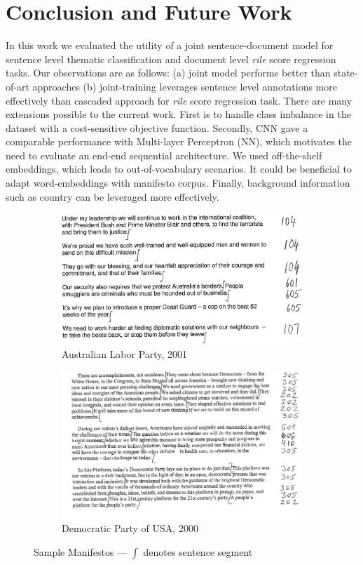 \documentclass[11pt,a4paper]{article}
\begin{document}
\section{Conclusion and Future Work}
In this work we evaluated the utility of a joint sentence-document model for sentence level thematic classification and document level \textit{rile} score regression tasks. Our observations are as follows: (a) joint model performs better than state-of-art approaches (b) joint-training leverages sentence level annotations more effectively than cascaded approach for \textit{rile} score regression task.
There are many extensions possible to the current work. First is to handle class imbalance in the dataset with a cost-sensitive objective function. Secondly, CNN gave a comparable performance with Multi-layer Perceptron (NN), which motivates the need to evaluate an end-end sequential architecture. We used off-the-shelf embeddings, which leads to out-of-vocabulary scenarios. It could be beneficial to  adapt word-embeddings with manifesto corpus. Finally, background information such as country can be leveraged more effectively.

\begin{figure}[!ht]
\centering
\begin{subfigure}{.45\textwidth}
  \includegraphics[width=1\linewidth]{Aus_Labor.png}
  \caption{Australian Labor Party, 2001}
  \label{fig:sub1}
\end{subfigure}%
\begin{subfigure}{.55\textwidth}
  \includegraphics[width=1.1\linewidth]{US_Democrats.png}
  \caption{Democratic Party of USA, 2000}
  \label{fig:sub2}
 \end{subfigure}
 \caption{Sample Manifestos --- $\int$ denotes sentence segment}
 \end{figure}
 
\end{document}
